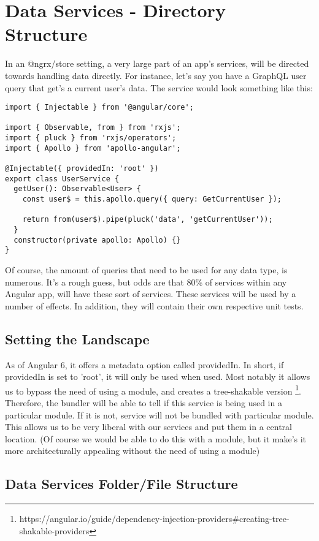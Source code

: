\maketitle{}
\section{ Data Services - Directory Structure }

In an @ngrx/store setting, a very large part of an app's services, will be
directed towards handling data directly. For instance, let's say you have a
GraphQL user query that get's a current user's data. The service would look
something like this:
\begin{lstlisting}
import { Injectable } from '@angular/core';

import { Observable, from } from 'rxjs';
import { pluck } from 'rxjs/operators';
import { Apollo } from 'apollo-angular';

@Injectable({ providedIn: 'root' })
export class UserService {
  getUser(): Observable<User> {
    const user$ = this.apollo.query({ query: GetCurrentUser });

    return from(user$).pipe(pluck('data', 'getCurrentUser'));
  }
  constructor(private apollo: Apollo) {}
}
\end{lstlisting}

Of course, the amount of queries that need to be used for any data type, is
numerous. It's a rough guess, but odds are that 80\% of services within any
Angular app, will have these sort of services. These services will be used by a
number of effects. In addition, they will contain their own respective unit
tests.

\subsection{ Setting the Landscape }
As of Angular 6, it offers a metadata option called providedIn. In short, if
providedIn is set to 'root', it will only be used when used. Most notably it
allows us to bypass the need of using a module, and creates a tree-shakable
version \footnote{https://angular.io/guide/dependency-injection-providers\#creating-tree-shakable-providers}.
Therefore, the bundler will be able to tell if this service is being used in a
particular module. If it is not, service will not be bundled with particular
module. This allows us to be very liberal with our services and put them in a
central location. (Of course we would be able to do this with a module, but
it make's it more architecturally appealing without the need of using a
module)

\subsection{ Data Services Folder/File Structure }

